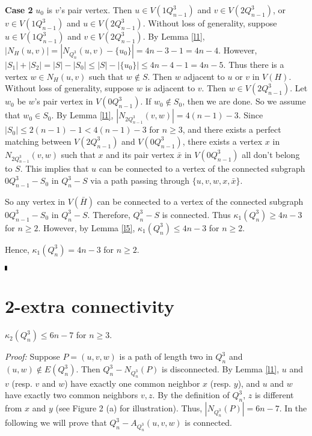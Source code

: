 \documentclass[preprint,number,12pt]{elsarticle}
\begin{document}
\textbf{Case 2 } $u_{0}$ is $v$'s pair vertex.
Then $u\in V(1Q_{n-1}^{3})$ and $v\in V(2Q_{n-1}^{3})$,
or $v\in V(1Q_{n-1}^{3})$ and $u\in V(2Q_{n-1}^{3})$.
Without loss of generality, suppose $u\in V(1Q_{n-1}^{3})$ and $v\in V(2Q_{n-1}^{3})$.
By Lemma \ref{l1}, $|N_H(u, v)|=|N_{Q_n^3}(u, v)-\{u_0\}|=4n-3-1=4n-4$.
However, $|S_1|+|S_2|=|S |- |S_0|\le |S |- |\{u_0\}|\le 4n-4-1=4n-5$.
Thus there is a vertex $w \in N_H(u, v)$ such that $w\not\in S$. 
Then $w$ adjacent to $u$ or $v$ in $V(H)$. Without loss of generality, 
suppose $w$ is adjacent to $v$. Then $w\in V(2Q_{n-1}^{3})$.
Let $w_{0}$ be $w$'s pair vertex in $V(0Q_{n-1}^{3})$. If $w_{0} \not\in S_{0}$, then we are done.
So we assume that $w_{0} \in S_{0}$.
By Lemma \ref{l1}, $|N_{2Q_{n-1}^{3}}(v, w)|=4(n-1)-3$. Since
$|S_0|\le 2(n-1)-1<4(n-1)-3$ for $n\ge 3$, and there exists a perfect matching between
$V(2Q_{n-1}^{3})$ and $V(0Q_{n-1}^{3})$, there
exists a vertex $x$ in $N_{2Q_{n-1}^{3}}(v,w)$ such that $x$ and its pair vertex $\bar{x}$ in $V(0Q_{n-1}^3)$
all don't belong to $S$.
This implies that $u$ can be connected to a vertex of the connected subgraph $0Q_{n-1}^{3}-S_0$ in
$Q_{n}^{3}-S$ via a path passing through $\{u, v, w, x,\bar{x}\}$.

So any vertex in $V(\bar{H})$ can be connected to a vertex of the connected subgraph $0Q_{n-1}^{3}-S_{0}$ in $Q_{n}^{3}-S$. Therefore, $Q_{n}^{3}-S$ is connected.
Thus $\kappa_1(Q_{n}^{3})\ge 4n-3$ for $n \geq 2$.
However, by Lemma \ref{l5}, $\kappa_1(Q_{n}^{3})\le 4n-3$ for $n \geq 2$.

Hence, $\kappa_1(Q_{n}^{3})=4n-3$ for $n \geq 2$.

$\hfill\rule{1mm}{2mm}$




\section{2-extra connectivity}
\begin{lem}\label{l6}
$\kappa_2(Q_{n}^{3})\le 6n-7$ for $n \geq 3$.
\end{lem}
\emph{Proof:}
Suppose $P = (u, v, w)$ is a path of length two in $Q_{n}^{3}$ and $(u, w) \not\in E(Q_{n}^{3})$.
Then $Q_{n}^{3}-N_{Q_{n}^{3}}(P)$ is disconnected.
By Lemma \ref{l1}, $u$ and $v$ (resp. $v$ and $w$) have exactly one common neighbor $x$ (resp. $y$), and $u$ and $w$ have exactly two common neighbors $v,z$. By the definition of $Q_n^3$, $z$ is different from
$x$ and $y$ (see Figure 2 (a) for illustration).
Thus, $|N_{Q_{n}^{3}}(P)| = 6n-7$.
In the following we will prove that $Q_{n}^{3}-A_{Q_{n}^{3}}(u, v, w)$ is connected.
\end{document}
